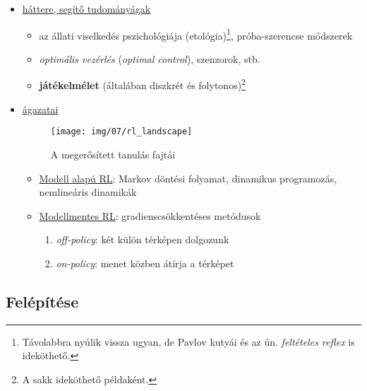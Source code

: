 \documentclass[a4paper, 11pt]{article}
\begin{document}
\begin{itemize}
	\item \underline{háttere, segítő tudományágak}
	\begin{itemize}
		\item az állati viselkedés pszichológiája (etológia)\footnote{Távolabbra nyúlik vissza ugyan, de Pavlov kutyái és az ún. \textit{feltételes reflex} is ideköthető.}, próba-szerencse módszerek
		\item \textit{optimális vezérlés} (\textit{optimal control}), szenzorok, stb.
		\item \textbf{játékelmélet} (általában diszkrét és folytonos)\footnote{A sakk ideköthető példaként.}
	\end{itemize}
	\item \underline{ágazatai}
	\begin{figure}[h!]
		\centering
		\texttt{[image: img/07/rl\_landscape]}
		\caption{A megerősített tanulás fajtái}
	\end{figure}
	\begin{itemize}
		\item \underline{Modell alapú RL}: Markov döntési folyamat, dinamikus programozás, nemlineáris dinamikák
		\item \underline{Modellmentes RL}: gradienscsökkentéses metódusok
		\begin{enumerate}[$\to$]
			\item \textit{off-policy}: két külön térképen dolgozunk
			\item \textit{on-policy}: menet közben átírja a térképet
		\end{enumerate}
	\end{itemize}
\end{itemize}


\subsection{Felépítése}
\end{document}
